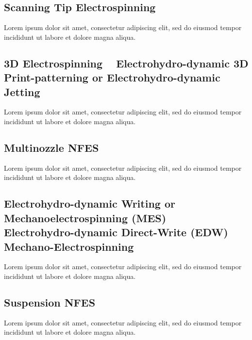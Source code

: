 \documentclass[5p,,preprint,12pt,twocolumn]{elsarticle}
\begin{document}
\subsection{Scanning Tip Electrospinning \unskip~\protect\cite{527120:11974306}}Lorem ipsum dolor sit amet, consectetur adipiscing elit, sed do eiusmod tempor incididunt ut labore et dolore magna aliqua.



\subsection{3D Electrospinning \unskip~\protect\cite{527120:11974313} \mbox{}\protect\newline Electrohydro-dynamic 3D Print-patterning or Electrohydro-dynamic Jetting \unskip~\protect\cite{527120:11974310}}Lorem ipsum dolor sit amet, consectetur adipiscing elit, sed do eiusmod tempor incididunt ut labore et dolore magna aliqua.



\subsection{Multinozzle NFES \unskip~\protect\cite{527120:11974322,527120:11974323,527120:11974324}}Lorem ipsum dolor sit amet, consectetur adipiscing elit, sed do eiusmod tempor incididunt ut labore et dolore magna aliqua.



\subsection{Electrohydro-dynamic Writing or Mechanoelectrospinning (MES) \unskip~\protect\cite{527120:11974311} \mbox{}\protect\newline Electrohydro-dynamic Direct-Write (EDW) \unskip~\protect\cite{527120:11974328} \mbox{}\protect\newline Mechano-Electrospinning \unskip~\protect\cite{527120:11974304}}Lorem ipsum dolor sit amet, consectetur adipiscing elit, sed do eiusmod tempor incididunt ut labore et dolore magna aliqua.



\subsection{Suspension NFES \unskip~\protect\cite{527120:12033656}}Lorem ipsum dolor sit amet, consectetur adipiscing elit, sed do eiusmod tempor incididunt ut labore et dolore magna aliqua.
\end{document}
